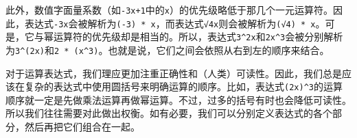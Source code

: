 此外，数值字面量系数（如\verb|-3x+1|中的\verb|x|）的优先级略低于那几个一元运算符。因此，表达式\verb|-3x|会被解析为\verb|(-3) * x|，而表达式\verb|√4x|则会被解析为\verb|(√4) * x|。可是，它与幂运算符的优先级却是相当的。所以，表达式\verb|3^2x|和\verb|2x^3|会被分别解析为\verb|3^(2x)|和\verb|2 * (x^3)|。也就是说，它们之间会依照从右到左的顺序来结合。

对于运算表达式，我们理应更加注重正确性和（人类）可读性。因此，我们总是应该在复杂的表达式中使用圆括号来明确运算的顺序。比如，表达式\verb|(2x)^3|的运算顺序就一定是先做乘法运算再做幂运算。不过，过多的括号有时也会降低可读性。所以我们往往需要对此做出权衡。如有必要，我们可以分别定义表达式的各个部分，然后再把它们组合在一起。